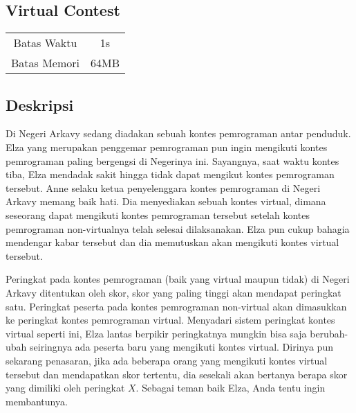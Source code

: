 \documentclass{article}
\begin{document}
\begin{center}
    \section*{Virtual Contest} %

    \begin{tabular}{ | c c | }
        \hline
        Batas Waktu  & 1s \\    %
        Batas Memori & 64MB \\  %
        \hline
    \end{tabular}
\end{center}

\subsection*{Deskripsi}
Di Negeri Arkavy sedang diadakan sebuah kontes pemrograman antar penduduk. Elza yang merupakan penggemar 
pemrograman pun ingin mengikuti kontes pemrograman paling bergengsi di Negerinya ini. Sayangnya, saat waktu kontes tiba,
Elza mendadak sakit hingga tidak dapat mengikut kontes pemrograman tersebut. Anne selaku ketua penyelenggara kontes 
pemrograman di Negeri Arkavy memang baik hati. Dia menyediakan sebuah kontes virtual, dimana seseorang dapat mengikuti 
kontes pemrograman tersebut setelah kontes pemrograman non-virtualnya telah selesai dilaksanakan. Elza pun cukup bahagia mendengar
kabar tersebut dan dia memutuskan akan mengikuti kontes virtual tersebut.

Peringkat pada kontes pemrograman (baik yang virtual maupun tidak) di Negeri Arkavy ditentukan oleh skor, skor yang paling tinggi akan mendapat peringkat satu. 
Peringkat peserta pada kontes pemrograman non-virtual akan dimasukkan ke peringkat kontes pemrograman virtual. Menyadari sistem 
peringkat kontes virtual seperti ini, Elza lantas berpikir peringkatnya mungkin bisa saja berubah-ubah seiringnya ada peserta baru 
yang mengikuti kontes virtual. Dirinya pun sekarang penasaran, jika ada beberapa orang yang mengikuti kontes virtual tersebut dan mendapatkan skor tertentu, dia 
sesekali akan bertanya berapa skor yang dimiliki oleh peringkat $X$. Sebagai teman baik Elza, Anda tentu ingin membantunya.
\end{document}
